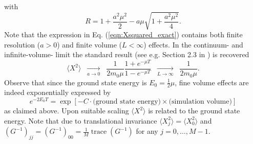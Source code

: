 \documentclass[11pt]{article}
\begin{document}
with
\begin{equation}
R = 1+\frac{a^2\mu^2}{2}-a\mu\sqrt{1+\frac{a^2\mu^2}{4}}.
\end{equation}
Note that the expression in Eq. (\ref{eqn:Xsquared_exact}) contains both finite resolution ($a>0$) and finite volume ($L<\infty$) effects. In the continuum- and infinite-volume- limit the standard result (see e.g. Section 2.3 in \cite{Sakurai1994}) is recovered
\begin{equation}
\langle X^2\rangle\;\; \underset{a\rightarrow 0}{\longrightarrow}\;\;
 \frac{1}{2m_0\mu}\frac{1+e^{-\mu T}}{1-e^{-\mu T}}\;\; \underset{L\rightarrow \infty}{\longrightarrow}\;\;\frac{1}{2m_0 \mu}.
\end{equation}
Observe that since the ground state energy is $E_0=\frac{1}{2}\mu$, fine volume effects are indeed exponentially expressed by
\begin{equation}
e^{-2E_0T} = \exp\left[-C\cdot \text{(ground state energy)}\times\text{(simulation volume)}\right]
\end{equation}
as claimed above. Upon suitable scaling $\langle X^2\rangle$ is related to the ground state energy. Note that due to translational invariance $\langle X_j^2\rangle =\langle X_0^2\rangle$ and $\left(G^{-1}\right)_{jj}=\left(G^{-1}\right)_{00}=\frac{1}{M}\operatorname{trace}\left(G^{-1}\right)$ for any $j=0,\dots,M-1$.
\end{document}
